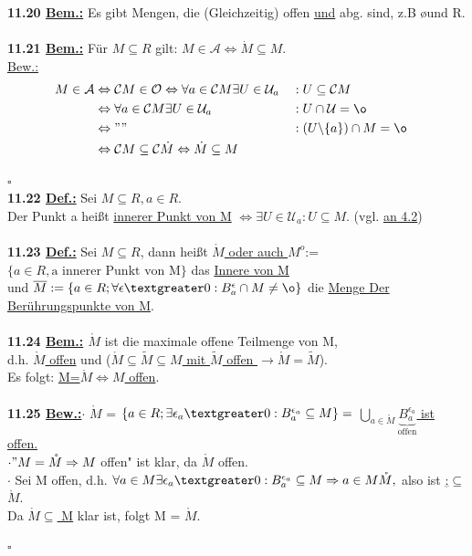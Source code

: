 \documentclass[]{scrartcl}
\begin{document}
 	\textbf{11.20 \underline{Bem.:}} Es gibt Mengen, die (Gleichzeitig) offen \underline{und} abg. sind, z.B \o und R.\\
 	\\
 	\textbf{11.21 \underline{Bem.:}} Für $M\subseteq R$ gilt:  \ul{$M\in \mathcal{A} \Leftrightarrow \dot{M}\subseteq M$}.\\
 	\underline{Bew.:} 
 		\begin{align}
 			M\in \mathcal{A} &\Leftrightarrow \mathcal{C}M\in \mathcal{O} \Leftrightarrow \forall a \in \mathcal{C}M \exists U \in \mathcal{U}_a&&:U \subseteq \mathcal{C}M&\\
 			&\Leftrightarrow \forall a \in \mathcal{C}M \exists U \in \mathcal{U}_a &&: U \cap \mathcal{U}=\o\\
 			&\Leftrightarrow""&&:(U\backslash\{a\})\cap M =\o&\\
 			&\Leftrightarrow \mathcal{C}M\subseteq\mathcal{C}\dot{M}\Leftrightarrow\dot{M}\subseteq M&
 		\end{align}

	\hfill$\square$\\
	\textbf{11.22 \underline{Def.:}} Sei $M \subseteq R, a\in R.$\\
	Der Punkt a heißt \ul{innerer Punkt von M} $\Leftrightarrow \exists U \in \mathcal{U}_a:U\subseteq M.$ (vgl.  \ul{an 4.2})\\
	\\
	\textbf{11.23 \underline{Def.:}} Sei $M \subseteq R$, dann heißt  \ul{$\mathring{M}$ oder auch $M^o$}:=$\{a\in R,\text{a innerer Punkt von M}\}$ das \ul{Innere von M}\\
	und $\overline{M}:=\{a\in R; \forall \epsilon \textgreater 0: B_a^\epsilon \cap M \neq\o\}$ die \ul{Menge Der Berührungspunkte von M}.\\
	\\
	\textbf{11.24 \underline{Bem.:} $\mathring{M}$} ist die maximale offene Teilmenge von M,\\
	d.h. \ul{$\mathring{M}$ offen} und (\ul{$\mathring{M}\subseteq \tilde{M}\subseteq M$ mit $\tilde{M}$ offen $\rightarrow\mathring{M}=\tilde{M}$}).\\
	Es folgt: \ul{M=$\mathring{M} \Leftrightarrow M$ offen}.\\
	\\
	\textbf{11.25 \underline{Bew.:}}$\cdot$ \ul{$\mathring{M}$} = 
	$\{a\in R ; \exists \epsilon_{a}\textgreater 0:B_a^{\epsilon_{a}}\subseteq M\}=$ \ul{$\bigcup_{a\in \mathring{M}}\underbrace{B_a^{\epsilon_{a}}}_{\text{offen}}$ ist offen.}\\
	$\cdot"M=\mathring{M}\Rightarrow M$ offen" ist klar, da $\mathring{M}$ offen.\\
	$\cdot$ Sei M offen, d.h. $\forall a \in M \exists \epsilon_{a}\textgreater 0: B_a^{\epsilon_{a}}\subseteq M \Rightarrow a \in M\mathring{M},$ also ist \ul{;$\subseteq$ $\mathring{M}$}.\\
	Da \ul{$\mathring{M}\subseteq$ M} klar ist, folgt M = $\mathring{M}$.\\
	\strut\hfill$\square$\\
	
	
	
	
		
	
\end{document}
